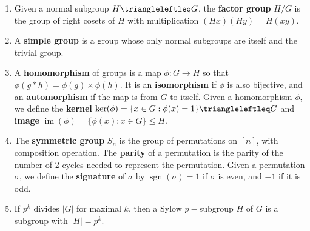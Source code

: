 \documentclass[12pt, a4paper]{article}
\DeclareMathOperator{\im}{im}
\theoremstyle{nonumberplain}
\begin{document}
\begin{enumerate}[nolistsep]
    \item Given a normal subgroup $H\triangleleftleq G$, the \textbf{factor group} $H/G$ is the group of right cosets of $H$ with multiplication $(Hx)(Hy)=H(xy)$.
    \item A \textbf{simple group} is a group whose only normal subgroups are itself and the trivial group.
    \item A \textbf{homomorphism} of groups is a map $\phi:G\to H$ so that $\phi(g*h)=\phi(g)\times \phi(h)$.
        It is an \textbf{isomorphism} if $\phi$ is also bijective, and an \textbf{automorphism} if the map is from $G$ to itself.
        Given a homomorphism $\phi$, we define the \textbf{kernel} $\ker(\phi)=\{x\in G:\phi(x)=1\}\triangleleftleq G$ and \textbf{image} $\im(\phi)=\{\phi(x):x\in G\}\leq H$.
    \item The \textbf{symmetric group} $S_n$ is the group of permutations on $[n]$, with composition operation.
        The \textbf{parity} of a permutation is the parity of the number of 2-cycles needed to represent the permutation.
        Given a permutation $\sigma$, we define the \textbf{signature} of $\sigma$ by $\operatorname{sgn}(\sigma)=1$ if $\sigma$ is even, and $-1$ if it is odd.
    \item If $p^k$ divides $|G|$ for maximal $k$, then a Sylow $p-$subgroup $H$ of $G$ is a subgroup with $|H|=p^k$.
\end{enumerate}
\end{document}
